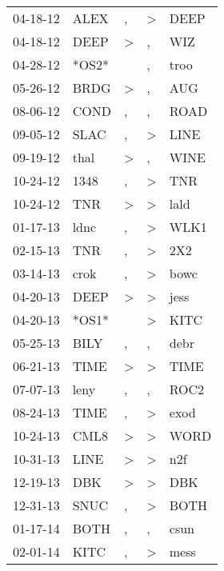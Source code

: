 \begin{supertabular}{lllll}
 04-18-12 &   ALEX &                , &     \textgreater &   DEEP \\
 04-18-12 &   DEEP &     \textgreater &                , &    WIZ \\
 04-28-12 &  *OS2* &                  &                , &   troo \\
 05-26-12 &   BRDG &     \textgreater &                , &    AUG \\
 08-06-12 &   COND &                , &                , &   ROAD \\
 09-05-12 &   SLAC &                , &     \textgreater &   LINE \\
 09-19-12 &   thal &     \textgreater &                , &   WINE \\
 10-24-12 &   1348 &                , &     \textgreater &    TNR \\
 10-24-12 &    TNR &     \textgreater &     \textgreater &   lald \\
 01-17-13 &   ldnc &                , &     \textgreater &   WLK1 \\
 02-15-13 &    TNR &                , &     \textgreater &    2X2 \\
 03-14-13 &   crok &                , &     \textgreater &   bowc \\
 04-20-13 &   DEEP &     \textgreater &     \textgreater &   jess \\
 04-20-13 &  *OS1* &                  &     \textgreater &   KITC \\
 05-25-13 &   BILY &                , &                , &   debr \\
 06-21-13 &   TIME &     \textgreater &     \textgreater &   TIME \\
 07-07-13 &   leny &                , &                , &   ROC2 \\
 08-24-13 &   TIME &                , &     \textgreater &   exod \\
 10-24-13 &   CML8 &     \textgreater &     \textgreater &   WORD \\
 10-31-13 &   LINE &     \textgreater &     \textgreater &    n2f \\
 12-19-13 &    DBK &     \textgreater &     \textgreater &    DBK \\
 12-31-13 &   SNUC &                , &     \textgreater &   BOTH \\
 01-17-14 &   BOTH &                , &                , &   csun \\
 02-01-14 &   KITC &                , &     \textgreater &   mess \\

\end{supertabular}
